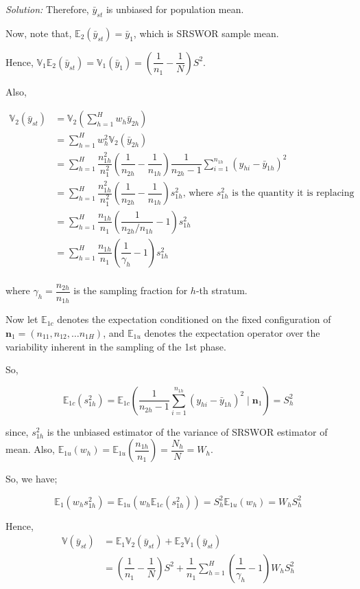 \documentclass[12pt]{article}
\newcommand{\E}{\mathbb{E}}
\newcommand{\Var}{\mathbb{V}}
\theoremstyle{definition}
\newenvironment{answer}{\textit{Solution: }\quad }{ \hfill \qedsymbol}
\begin{document}
\begin{answer}
	Therefore, $\bar{y}_{st}$ is unbiased for population mean. 

	Now, note that, $\E_2(\bar{y}_{st}) = \bar{y}_1$, which is SRSWOR sample mean. 

	Hence, $\Var_1\E_2(\bar{y}_{st}) = \Var_1\left( \bar{y}_1 \right) = \left( \dfrac{1}{n_1} - \dfrac{1}{N}\right)S^2$.
	
	Also,

	\begin{align*}
		\Var_2\left( \bar{y}_{st} \right) & = \Var_2 \left( \sum_{h = 1}^{H}w_h \bar{y}_{2h} \right)\\
		& = \sum_{h = 1}^{H} w_h^2 \Var_2(\bar{y}_{2h})\\
		& = \sum_{h = 1}^{H} \dfrac{n_{1h}^2}{n_1^2} \left( \dfrac{1}{n_{2h}} - \dfrac{1}{n_{1h}} \right) \dfrac{1}{n_{2h} - 1} \sum_{i = 1}^{n_{1h}} \left(y_{hi} - \bar{y}_{1h}\right)^2\\
		& = \sum_{h = 1}^{H} \dfrac{n_{1h}^2}{n_1^2} \left( \dfrac{1}{n_{2h}} - \dfrac{1}{n_{1h}} \right) s_{1h}^2 \text{, where } s_{1h}^2 \text{ is the quantity it is replacing}\\
		& = \sum_{h = 1}^{H} \dfrac{n_{1h}}{n_1} \left( \dfrac{1}{n_{2h} / n_{1h}} - 1 \right) s_{1h}^2\\
		& = \sum_{h = 1}^{H} \dfrac{n_{1h}}{n_1} \left( \dfrac{1}{\gamma_h} - 1 \right) s_{1h}^2\\
	\end{align*}

	where $\gamma_h = \dfrac{n_{2h}}{n_{1h}}$ is the sampling fraction for $h$-th stratum.

	Now let $\E_{1c}$ denotes the expectation conditioned on the fixed configuration of $\mathbf{n}_1 = \left(n_{11}, n_{12}, \dots n_{1H}\right)$, and $\E_{1u}$ denotes the expectation operator over the variability inherent in the sampling of the 1st phase.

	So, 

	$$\E_{1c}(s_{1h}^2) = \E_{1c}\left( \dfrac{1}{n_{2h} - 1} \sum_{i = 1}^{n_{1h}} \left(y_{hi} - \bar{y}_{1h}\right)^2 \mid \mathbf{n}_1 \right) = S_h^2$$

	since, $s_{1h}^2$ is the unbiased estimator of the variance of SRSWOR estimator of mean. Also, $\E_{1u}(w_h) = \E_{1u}\left( \dfrac{n_{1h}}{n_1} \right) = \dfrac{N_h}{N} = W_h$.

	So, we have;
	
	\begin{equation*}
		\E_1(w_h s_{1h}^2) = \E_{1u}(w_h \E_{1c} (s_{1h}^2)) = S_h^2 \E_{1u}(w_h) = W_hS_h^2
	\end{equation*}

	Hence, 
	\begin{align*}
		\Var(\bar{y}_{st}) 
		& = \E_1\Var_2(\bar{y}_{st}) + \E_2\Var_1(\bar{y}_{st})\\
		& = \left( \dfrac{1}{n_1} - \dfrac{1}{N} \right)S^2 + \dfrac{1}{n_1} \sum_{h=1}^{H} \left(\dfrac{1}{\gamma_h} - 1\right) W_h S_h^2
	\end{align*}

\end{answer}
\end{document}
